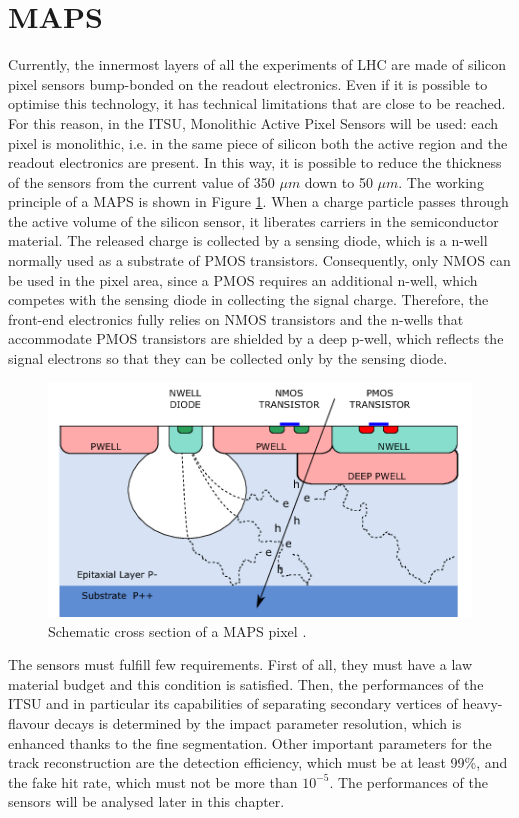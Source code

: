 \section{MAPS}
\label{sec:maps}
Currently, the innermost layers of all the experiments of LHC are made of silicon pixel sensors bump-bonded on the readout electronics. Even if it is possible to optimise this technology, it has technical limitations that are close to be reached. For this reason, in the ITSU, Monolithic Active Pixel Sensors will be used: each pixel is monolithic, i.e. in the same piece of silicon both the active region and the readout electronics are present. In this way, it is possible to reduce the thickness of the sensors from the current value of 350 $\mu m$ down to 50 $\mu m$. The working principle of a MAPS is shown in Figure \ref{fig:maps}. When a charge particle passes through the active volume of the silicon sensor, it liberates carriers in the semiconductor material. The released charge is collected by a sensing diode, which is a n-well normally used as a substrate of PMOS transistors. Consequently, only NMOS can be used in the pixel area, since a PMOS requires an additional n-well, which competes with the sensing diode in collecting the signal charge. Therefore, the front-end electronics fully relies on NMOS transistors and the n-wells that accommodate PMOS transistors are shielded by a deep p-well, which reflects the signal electrons so that they can be collected only by the sensing diode.
%
\begin{figure}
  \centering
  \includegraphics[scale=0.7]{figures/maps.png}
  \caption{Schematic cross section of a MAPS pixel \cite{uptdr}.}
  \label{fig:maps}
\end{figure}
%
The sensors must fulfill few requirements. First of all, they must have a law material budget and this condition is satisfied. Then, the performances of the ITSU and in particular its capabilities of separating secondary vertices of heavy-flavour decays is determined by the impact parameter resolution, which is enhanced thanks to the fine segmentation. Other important parameters for the track reconstruction are the detection efficiency, which must be at least 99\%, and the fake hit rate, which must not be more than $10^{-5}$. The performances of the sensors will be analysed later in this chapter.\\
